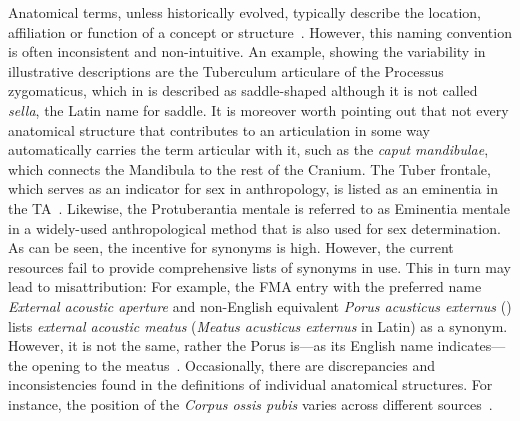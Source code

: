 \documentclass[sw]{iosart2x}
\begin{document}
Anatomical terms, unless historically evolved, typically describe the location, affiliation or function of a concept or structure~\citep{reforminganatomical}.
However, this naming convention is often inconsistent and non-intuitive.
An example, showing the variability in illustrative descriptions are the Tuberculum articulare of the Processus zygomaticus, which in \cite{anatomie} is described as saddle-shaped although it is not called \emph{sella}, the Latin name for saddle.
It is moreover worth pointing out that not every anatomical structure that contributes to an articulation in some way automatically carries the term articular with it, such as the \emph{caput mandibulae}, which connects the Mandibula to the rest of the Cranium.
The Tuber frontale, which serves as an indicator for sex in anthropology, is listed as an eminentia in the TA~\citep{ta2}.
Likewise, the Protuberantia mentale is referred to as Eminentia mentale in a widely-used anthropological method that is also used for sex determination.
As can be seen, the incentive for synonyms is high.
However, the current resources fail to provide comprehensive lists of synonyms in use.
This in turn may lead to misattribution: For example, the FMA entry with the preferred name \emph{External acoustic aperture} and non-English equivalent \emph{Porus acusticus externus} () lists \emph{external acoustic meatus} (\emph{Meatus acusticus externus} in Latin) as a synonym.
However, it is not the same, rather the Porus is---as its English name indicates---the opening to the meatus~\citep{anatomylexicon}.
Occasionally, there are discrepancies and inconsistencies found in the definitions of individual anatomical structures.
For instance, the position of the \emph{Corpus ossis pubis} varies across different sources~\citep{anatomylexicon,prometheus,allgemeineanatomie,dualereiheanatomie,anatomiedesmenschen}.
\end{document}
